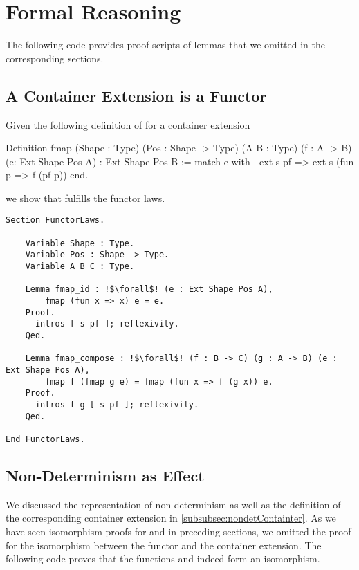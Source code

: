 \section{Formal Reasoning}

The following code provides proof scripts of lemmas that we omitted in the corresponding sections.

\subsection*{A Container Extension is a Functor}
\label{subsec:appendix:extFunctor}

Given the following definition of  for a container extension 

\begin{coqcode}
Definition fmap (Shape : Type) (Pos : Shape -> Type) (A B : Type)
    (f : A -> B) (e: Ext Shape Pos A) : Ext Shape Pos B :=
    match e with
    | ext s pf => ext s (fun p => f (pf p))
    end.
\end{coqcode}

we show that  fulfills the functor laws.

\begin{verbatim}
Section FunctorLaws.

    Variable Shape : Type.
    Variable Pos : Shape -> Type.
    Variable A B C : Type.

    Lemma fmap_id : !$\forall$! (e : Ext Shape Pos A),
        fmap (fun x => x) e = e.
    Proof.
      intros [ s pf ]; reflexivity.
    Qed.

    Lemma fmap_compose : !$\forall$! (f : B -> C) (g : A -> B) (e : Ext Shape Pos A),
        fmap f (fmap g e) = fmap (fun x => f (g x)) e.
    Proof.
      intros f g [ s pf ]; reflexivity.
    Qed.

End FunctorLaws.
\end{verbatim}

\subsection*{Non\--Determinism as Effect}
\label{subsec:appendix:nondet}

We discussed the representation of non\--determinism as well as the definition of the corresponding container extension in \autoref{subsubsec:nondetContainter}.
As we have seen isomorphism proofs for  and  in preceding sections, we omitted the proof for the isomorphism between the functor  and the container extension.
The following code proves that the functions  and  indeed form an isomorphism.

